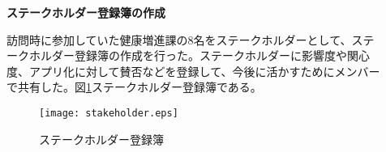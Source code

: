 ﻿\begin{description}
 \item[]
  \textbf{ステークホルダー登録簿の作成}\par
 訪問時に参加していた健康増進課の8名をステークホルダーとして、ステークホルダー登録簿の作成を行った。ステークホルダーに影響度や関心度、アプリ化に対して賛否などを登録して、今後に活かすためにメンバーで共有した。図\ref{fig:addsh}ステークホルダー登録簿である。

\begin{figure}[htbp]
\centering
\texttt{[image: stakeholder.eps]}
\caption{ステークホルダー登録簿}
\label{fig:addsh}
\end{figure}
\par

  \par
\end{description}
